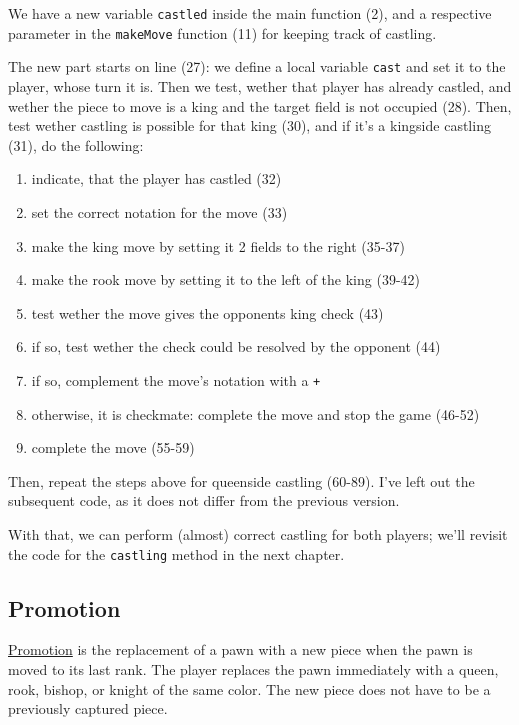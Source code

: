 We have a new variable \texttt{castled} inside the main function (2), and a respective parameter
in the \texttt{makeMove} function (11) for keeping track of castling.

The new part starts on line (27): we define a local variable \texttt{cast} and set it to the player,
whose turn it is.
Then we test, wether that player has already castled, and wether the piece to move is a king and the
target field is not occupied (28).
Then, test wether castling is possible for that king (30), and if it's a kingside castling (31),
do the following:
\begin{enumerate}
  \item indicate, that the player has castled (32)
  \item set the correct notation for the move (33)
  \item make the king move by setting it 2 fields to the right (35-37)
  \item make the rook move by setting it to the left of the king (39-42)
  \item test wether the move gives the opponents king check (43)
  \item if so, test wether the check could be resolved by the opponent (44)
  \item if so, complement the move's notation with a \texttt{+}
  \item otherwise, it is checkmate: complete the move and stop the game (46-52)
  \item complete the move (55-59)
\end{enumerate}

Then, repeat the steps above for queenside castling (60-89). I've left out the subsequent code, as
it does not differ from the previous version.

With that, we can perform (almost) correct castling for both players; we'll revisit the code for
the \texttt{castling} method in the next chapter.

\subsection{Promotion}

\href{https://en.wikipedia.org/wiki/Promotion_(chess)}{Promotion} is the replacement of a pawn with a
new piece when the pawn is moved to its last rank.
The player replaces the pawn immediately with a queen, rook, bishop, or knight of the same color.
The new piece does not have to be a previously captured piece.

